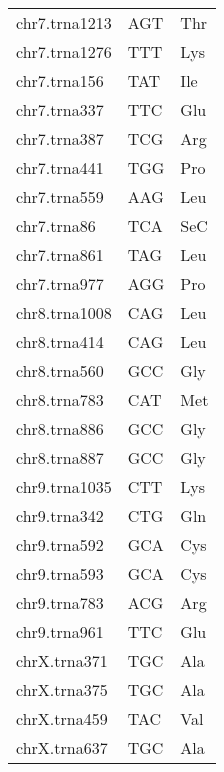 \begin{longtable}{@{}l>{\collectcell\anticodon}l<{\endcollectcell}l@{}}
    chr7.trna1213 & AGT & Thr \\
    chr7.trna1276 & TTT & Lys \\
    chr7.trna156 & TAT & Ile \\
    chr7.trna337 & TTC & Glu \\
    chr7.trna387 & TCG & Arg \\
    chr7.trna441 & TGG & Pro \\
    chr7.trna559 & AAG & Leu \\
    chr7.trna86 & TCA & SeC \\
    chr7.trna861 & TAG & Leu \\
    chr7.trna977 & AGG & Pro \\
    chr8.trna1008 & CAG & Leu \\
    chr8.trna414 & CAG & Leu \\
    chr8.trna560 & GCC & Gly \\
    chr8.trna783 & CAT & Met \\
    chr8.trna886 & GCC & Gly \\
    chr8.trna887 & GCC & Gly \\
    chr9.trna1035 & CTT & Lys \\
    chr9.trna342 & CTG & Gln \\
    chr9.trna592 & GCA & Cys \\
    chr9.trna593 & GCA & Cys \\
    chr9.trna783 & ACG & Arg \\
    chr9.trna961 & TTC & Glu \\
    chrX.trna371 & TGC & Ala \\
    chrX.trna375 & TGC & Ala \\
    chrX.trna459 & TAC & Val \\
    chrX.trna637 & TGC & Ala \\
    \bottomrule
\end{longtable}
